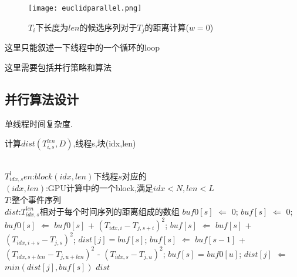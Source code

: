 {\color{red}{这个算法每个线程都是均匀的}}

\begin{figure}[H] %
	\centering
	\texttt{[image: euclidparallel.png]}
	\caption{$T_i$下长度为$len$的候选序列对于$T_j$的距离计算($w=0$)}
	\label{fig:euclidparallel}
\end{figure}


这里只能叙述一下线程中的一个循环的loop

这里需要包括并行策略和算法
\subsection{并行算法设计}

{}

{\color{red}{而且这里面的算法都是存入GPU,而不是返回的，有可能要去掉返回值}}

单线程时间复杂度.

\begin{algorithm}
	\caption{计算$dist(T_{i,s}^{len},D)$,线程s,块(idx,len)}
	\label{alg:kernel_ComputeDist}
	\begin{algorithmic}[1]
		\Require ~~\\
		$T_{idx,s}^len$:$block(idx,len)$下线程$s$对应的{\color{red}{候选序列}}\\
		$(idx,len)$:GPU计算中的一个block,满足$idx < N,len < L$\\
		$T$:整个事件序列
		\Ensure ~~\\
		$dist$:$T_{idx,s}^{len}$相对于每个时间序列的距离组成的数组
			\State $buf0[s]$ $\Leftarrow$ $0$;
			\State  $buf[s]$ $\Leftarrow$ $0$;
				\State $buf0[s]$ $\Leftarrow$ $buf0[s]$ + $(T_{idx,i}-T_{j,s+i})^2$;  \label{cccccc}
				\State $buf[s]$ $\Leftarrow$ $buf[s]$ + $(T_{idx,i+s}-T_{j,s})^2$;
			\EndFor
			\State $dist[j] = buf[s]$;
					\State $buf[s]$ $\Leftarrow$ $buf[s-1]$ + $(T_{idx,s+len}-T_{j,u+len})^2$ - $(T_{idx,s}-T_{j,u})^2$;
				\EndIf
					\State $buf[s]$ = $buf0[u]$;
				\EndIf
				\State $dist[j]$ $\Leftarrow$ $min(dist[j],buf[s])$
			\EndFor
		\EndFor
		\Return $dist$
	\end{algorithmic}
\end{algorithm}

